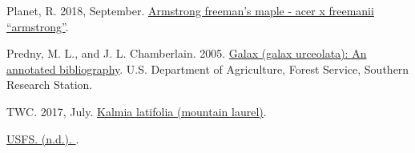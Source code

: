 \documentclass[
]{article}
\newlength{\cslhangindent}
\newlength{\cslentryspacingunit} %
\newenvironment{CSLReferences}[2] %
 {%
  \setlength{\parindent}{0pt}
  \ifodd #1
  \let\oldpar\par
  \def\par{\hangindent=\cslhangindent\oldpar}
  \fi
  \setlength{\parskip}{#2\cslentryspacingunit}
 }%
 {}
\begin{document}
\begin{CSLReferences}{1}{0}
\leavevmode{}%
Planet, R. 2018, September. \href{https://www.cirrusimage.com/tree_maple_armstrong_freeman/}{Armstrong freeman's maple - acer x freemanii {``armstrong''}}.

\leavevmode{}%
Predny, M. L., and J. L. Chamberlain. 2005. \href{https://www.srs.fs.usda.gov/pubs/gtr/gtr_srs087.pdf}{Galax (galax urceolata): An annotated bibliography}. U.S. Department of Agriculture, Forest Service, Southern Research Station.

\leavevmode{}%
TWC. 2017, July. \href{https://www.wildflower.org/plants/result.php?id_plant=KALA}{Kalmia latifolia (mountain laurel)}.

\leavevmode{}%
\href{https://www.fs.fed.us/wildflowers/beauty/mycotrophic/monotropa_uniflora.shtml}{USFS. (n.d.). }.

\end{CSLReferences}
\end{document}
